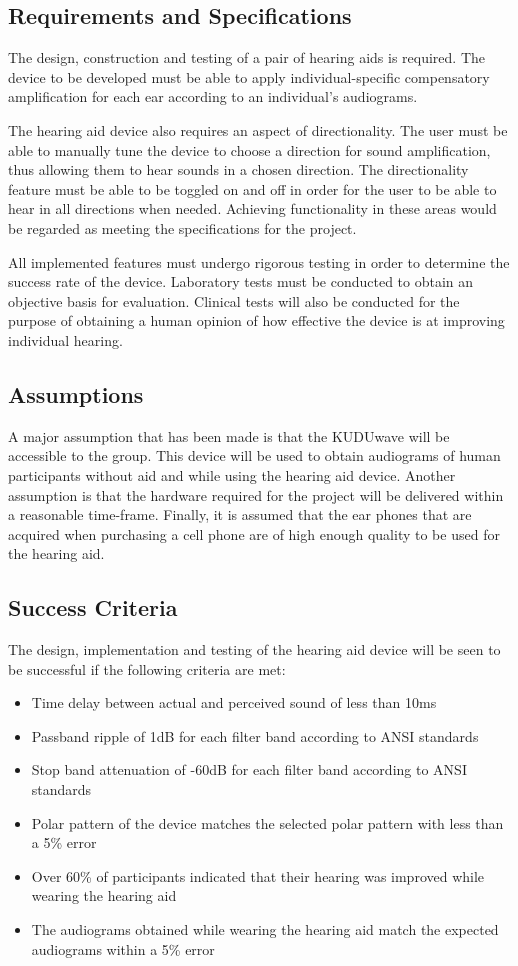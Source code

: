\documentclass[10pt,twocolumn]{witseiepaper}
\begin{document}
\subsection{Requirements and Specifications}
The design, construction and testing of a pair of hearing aids is required. The device to be developed must be able to apply individual-specific compensatory amplification for each ear according to an individual's audiograms. 

The hearing aid device also requires an aspect of directionality. The user must be able to manually tune the device to choose a direction for sound amplification, thus allowing them to hear sounds in a chosen direction. The directionality feature must be able to be toggled on and off in order for the user to be able to hear in all directions when needed. Achieving functionality in these areas would be regarded as meeting the specifications for the project. 

All implemented features must undergo rigorous testing in order to determine the success rate of the device. Laboratory tests must be conducted to obtain an objective basis for evaluation. Clinical tests will also be conducted for the purpose of obtaining a human opinion of how effective the device is at improving individual hearing. 

\subsection{Assumptions}
A major assumption that has been made is that the KUDUwave will be accessible to the group. This device will be used to obtain audiograms of human participants without aid and while using the hearing aid device. Another assumption is that the hardware required for the project will be delivered within a reasonable time-frame. Finally, it is assumed that the ear phones that are acquired when purchasing a cell phone are of high enough quality to be used for the hearing aid.

\subsection{Success Criteria}
The design, implementation and testing of the hearing aid device will be seen to be successful if the following criteria are met:

\begin{itemize}
	\item Time delay between actual and perceived sound of less than 10ms
	\item Passband ripple of 1dB for each filter band according to ANSI standards
	\item Stop band attenuation of -60dB for each filter band according to ANSI standards
	\item Polar pattern of the device matches the selected polar pattern with less than a 5\% error
	\item Over 60\% of participants indicated that their hearing was improved while wearing the hearing aid	
	\item The audiograms obtained while wearing the hearing aid match the expected audiograms within a 5\% error
\end{itemize}
\end{document}
